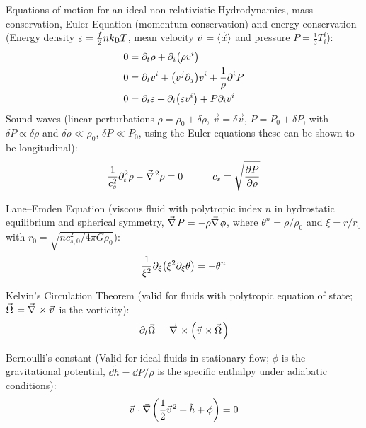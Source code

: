 			\noindent
			Equations of motion for an ideal non-relativistic Hydrodynamics, \ie mass conservation, Euler Equation (momentum conservation) and energy conservation (Energy density $\varepsilon=\frac{f}{2} n k_{\text{B}} T$, mean velocity $\vec{v}=\avg{\dot{\vec{x}}}$ and pressure $P = \frac{1}{3} T^{i}_i$):
			\begin{align}
				0 &= \partial_t \rho + \partial_i \qty(\rho v^i) \\
				0 &= \partial_t v^i + \qty(v^j \partial_j) v^i + \frac{1}{\rho} \partial^i P \\
				0 &= \partial_t \varepsilon + \partial_i \qty(\varepsilon v^i) + P \partial_i v^i
			\end{align}
			\noindent
			Sound waves (linear perturbations $\rho = \rho_0 + \delta \rho$, $\vec{v} = \delta \vec{v}$, $P = P_0 + \delta P$, with $\delta P \propto \delta \rho$ and $\delta \rho \ll \rho_0$, $\delta P \ll P_0$, using the Euler equations these can be shown to be longitudinal):
			\begin{equation}
				\frac{1}{c_s^2} \partial_t^2 \rho - \Nabla^2 \rho = 0 \hsp c_s = \sqrt{\frac{\partial P}{\partial \rho}}
			\end{equation}

			\noindent
			Lane--Emden Equation (viscous fluid with polytropic index $n$ in hydrostatic equilibrium and spherical symmetry, \ie $\Nabla P = - \rho \Nabla \phi$, where $\theta^n = \rho/\rho_0$ and $\xi = r/r_0$ with $r_0 = \sqrt{n c_{s,0}^2 / 4\pi G \rho_0}$):
			\begin{equation}
				\frac{1}{\xi^2} \partial_\xi \qty(\xi^2 \partial_\xi \theta) = - \theta^n
			\end{equation}

			\noindent
			Kelvin's Circulation Theorem (valid for fluids with polytropic equation of state; $\vec{\Omega} = \Nabla \times \vec{v}$ is the vorticity):
			\begin{equation}
				\partial_t \vec{\Omega} = \Nabla \times \qty(\vec{v} \times \vec{\Omega})
			\end{equation}

			\noindent
			Bernoulli's constant (Valid for ideal fluids in stationary flow; $\phi$ is the gravitational potential, $\dd \tilde{h} = \dd P / \rho$ is the specific enthalpy under adiabatic conditions):
			\begin{equation}
				\vec{v}\cdot \Nabla \qty(\frac{1}{2}\vec{v}^2 + \tilde{h} + \phi) = 0
			\end{equation}


